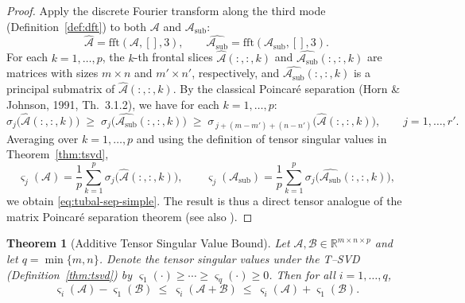 \documentclass{article}
\theoremstyle{plain}
\newtheorem{theorem}{Theorem}
\theoremstyle{definition}
\theoremstyle{remark}
\begin{document}
\begin{proof}
Apply the discrete Fourier transform along the third mode (Definition~\ref{def:dft}) to both 
$\mathcal{A}$ and $\mathcal{A}_{\mathrm{sub}}$:
\[
\widehat{\mathcal{A}} = \mathrm{fft}(\mathcal{A},[],3),
\qquad
\widehat{\mathcal{A}_{\mathrm{sub}}} = \mathrm{fft}(\mathcal{A}_{\mathrm{sub}},[],3).
\]
For each $k=1,\dots,p$, the $k$-th frontal slices 
$\widehat{\mathcal{A}}(:,:,k)$ and $\widehat{\mathcal{A}_{\mathrm{sub}}}(:,:,k)$ are matrices with
sizes $m\times n$ and $m'\times n'$, respectively, and 
$\widehat{\mathcal{A}_{\mathrm{sub}}}(:,:,k)$ is a principal submatrix of $\widehat{\mathcal{A}}(:,:,k)$.
By the classical Poincaré separation (Horn \& Johnson, 1991, Th.~3.1.2), we have for each $k=1,\dots,p$:
\[
\sigma_j\big(\widehat{\mathcal{A}}(:,:,k)\big)
\;\ge\;
\sigma_j\big(\widehat{\mathcal{A}_{\mathrm{sub}}}(:,:,k)\big)
\;\ge\;
\sigma_{\,j + (m - m') + (n - n')}\big(\widehat{\mathcal{A}}(:,:,k)\big),
\qquad j=1,\dots,r'.
\]
Averaging over $k=1,\dots,p$ and using the definition of tensor singular values in 
Theorem~\ref{thm:tsvd},
\[
\varsigma_j(\mathcal{A})
= \frac{1}{p}\sum_{k=1}^{p} \sigma_j\big(\widehat{\mathcal{A}}(:,:,k)\big),
\qquad
\varsigma_j(\mathcal{A}_{\mathrm{sub}})
= \frac{1}{p}\sum_{k=1}^{p} \sigma_j\big(\widehat{\mathcal{A}_{\mathrm{sub}}}(:,:,k)\big),
\]
we obtain \eqref{eq:tubal-sep-simple}. 
The result is thus a direct tensor analogue of the matrix Poincaré separation theorem 
(see also \citealp[Theorem 3.1]{zhang2021note}).
\end{proof}


\begin{theorem}[Additive Tensor Singular Value Bound]
\label{thm:tensor-sing-sv-simple}
Let $\mathcal A,\mathcal B\in\mathbb R^{m\times n\times p}$ and let
$q=\min\{m,n\}$. Denote the tensor singular values under the T--SVD
(Definition~\ref{thm:tsvd}) by
$\varsigma_1(\cdot)\ge\cdots\ge \varsigma_q(\cdot)\ge 0$.
Then for all $i=1,\dots,q$,
\begin{equation}
\label{eq:tensor-add-simple}
\varsigma_i(\mathcal A)-\varsigma_1(\mathcal B)
\ \le\
\varsigma_i(\mathcal A+\mathcal B)
\ \le\
\varsigma_i(\mathcal A)+\varsigma_1(\mathcal B).
\end{equation}
\end{theorem}
\end{document}
